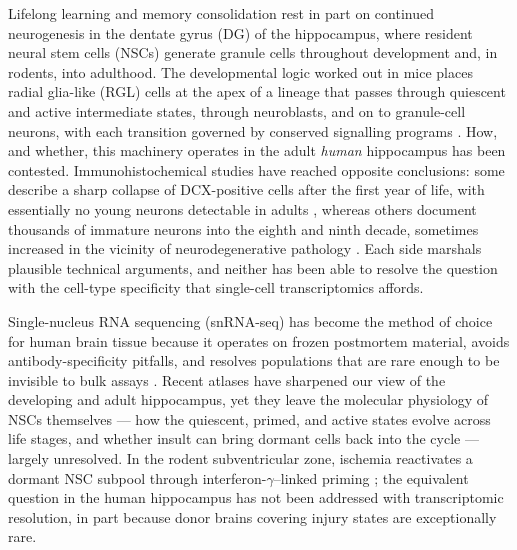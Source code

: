 \documentclass[11pt]{article}
\begin{document}
Lifelong learning and memory consolidation rest in part on continued
neurogenesis in the dentate gyrus (DG) of the hippocampus, where resident
neural stem cells (NSCs) generate granule cells throughout development and,
in rodents, into adulthood. The developmental logic worked out in mice places
radial glia-like (RGL) cells at the apex of a lineage that passes through
quiescent and active intermediate states, through neuroblasts, and on to
granule-cell neurons, with each transition governed by conserved signalling
programs \cite{encinas2011division,obernier2019neural,urban2019quiescence}.
How, and whether, this machinery operates in the adult \emph{human}
hippocampus has been contested. Immunohistochemical studies have reached
opposite conclusions: some describe a sharp collapse of DCX-positive cells
after the first year of life, with essentially no young neurons detectable in
adults \cite{sorrells2018human,cipriani2018hippocampal,franjic2022transcriptomic},
whereas others document thousands of immature neurons into the eighth and
ninth decade, sometimes increased in the vicinity of neurodegenerative
pathology \cite{boldrini2018human,morenojimenez2019adult,tobin2019human,terrerosroncal2021impact}.
Each side marshals plausible technical arguments, and neither has been able to
resolve the question with the cell-type specificity that single-cell
transcriptomics affords.

Single-nucleus RNA sequencing (snRNA-seq) has become the method of choice for
human brain tissue because it operates on frozen postmortem material, avoids
antibody-specificity pitfalls, and resolves populations that are rare enough
to be invisible to bulk assays \cite{habib2017massively}. Recent atlases have
sharpened our view of the developing \cite{zhong2020decoding} and adult
\cite{franjic2022transcriptomic,ayhan2021resolving} hippocampus, yet they
leave the molecular physiology of NSCs themselves --- how the quiescent,
primed, and active states evolve across life stages, and whether insult can
bring dormant cells back into the cycle --- largely unresolved. In the
rodent subventricular zone, ischemia reactivates a dormant NSC subpool
through interferon-$\gamma$--linked priming \cite{llorensbobadilla2015single};
the equivalent question in the human hippocampus has not been addressed with
transcriptomic resolution, in part because donor brains covering injury
states are exceptionally rare.
\end{document}

